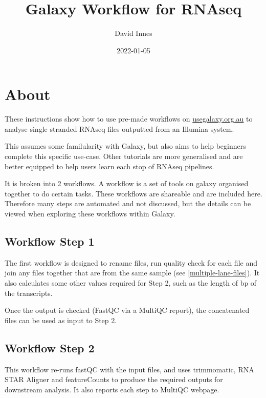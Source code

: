 \documentclass[
]{book}
\title{Galaxy Workflow for RNAseq}
\author{David Innes}
\date{2022-01-05}
\begin{document}
\maketitle

{
\setcounter{tocdepth}{1}
\tableofcontents
}
\hypertarget{about}{%
\chapter{About}\label{about}}

These instructions show how to use pre-made workflows on \url{usegalaxy.org.au}
to analyse single stranded RNAseq files outputted from an Illumina system.

This assumes some familularity with Galaxy, but also aims to help beginners complete this specific use-case. Other tutorials are more generalised and are better equipped to help users learn each stop of RNAseq pipelines.

It is broken into 2 workflows. A workflow is a set of tools on galaxy organised together to do certain tasks. These workflows are shareable and are included here. Therefore many steps are automated and not discussed, but the details can be viewed when exploring these workflows within Galaxy.

\hypertarget{workflow-step-1}{%
\section*{Workflow Step 1}\label{workflow-step-1}}

The first workflow is designed to rename files, run quality check for each file and join any files together that are from the same sample (see \ref{multiple-lane-files}). It also calculates some other values required for Step 2, such as the length of bp of the transcripts.

Once the output is checked (FastQC via a MultiQC report), the concatenated files can be used as input to Step 2.

\hypertarget{workflow-step-2}{%
\section*{Workflow Step 2}\label{workflow-step-2}}

This workflow re-runs fastQC with the input files, and uses trimmomatic, RNA STAR Aligner and featureCounts to produce the required outputs for downstream analysis. It also reports each step to MultiQC webpage.
\end{document}
